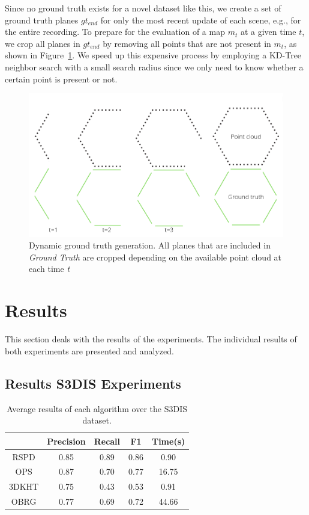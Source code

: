\documentclass[main.tex]{subfiles}
\begin{document}
Since no ground truth exists for a novel dataset like this, we create a set of ground truth planes $gt_{end}$ for only the most recent update of each scene, e.g., for the entire recording.
To prepare for the evaluation of a map $m_t$ at a given time $t$, we crop all planes in $gt_{end}$ by removing all points that are not present in $m_t$, as shown in
Figure~\ref{fig:dynGT}.
We speed up this expensive process by employing a KD-Tree neighbor search with a small search radius since we only need to know whether a certain point is present or not.
\begin{figure}[H]
    \centering
    \includegraphics[width=15 cm]{images/dynamic_eval.png}
    \caption[Dynamic Ground Truth Generation]{Dynamic ground truth generation. All planes that are included in \textit{Ground Truth} are cropped depending on
        the available point cloud at each time \textit{t} }
    \label{fig:dynGT}
\end{figure}

\section{Results}
This section deals with the results of the experiments. The individual results of both experiments are presented and analyzed. 

\subsection{Results S3DIS Experiments}

\begin{table}[H]
    \centering
    \begin{tabular}{c|cccc}
              & Precision & Recall & F1   & Time(s) \\ \hline
        RSPD  & 0.85      & 0.89   & 0.86 & 0.90    \\
        OPS   & 0.87      & 0.70   & 0.77 & 16.75   \\
        3DKHT & 0.75      & 0.43   & 0.53 & 0.91    \\
        OBRG  & 0.77      & 0.69   & 0.72 & 44.66
    \end{tabular}
    \caption[Overall S3DIS Results]{Average results of each algorithm over the S3DIS dataset.}
    \label{tab:algo-acc}
\end{table}
\end{document}
